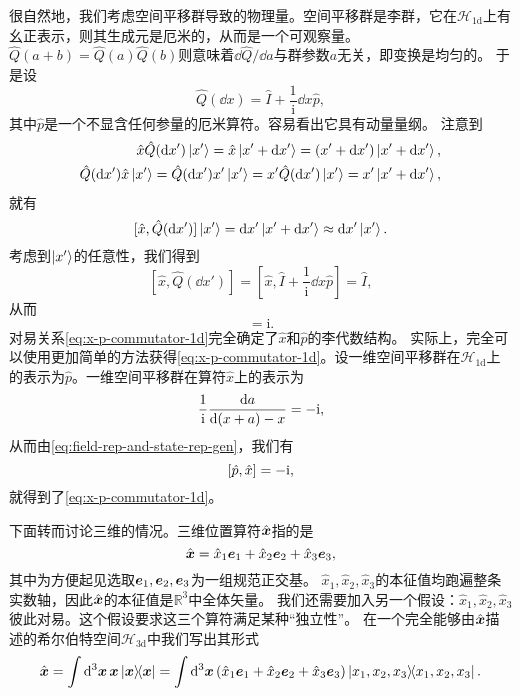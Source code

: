 \documentclass[hyperref, UTF8, a4paper]{ctexart}
\newcommand*{\ii}{\mathrm{i}}
\newcommand*{\reals}{\mathbb{R}}
\begin{document}
很自然地，我们考虑空间平移群导致的物理量。空间平移群是李群，它在$\mathcal{H}_{1\text{d}}$上有幺正表示，则其生成元是厄米的，从而是一个可观察量。
$\hat{Q}(a+b)=\hat{Q}(a) \hat{Q}(b)$则意味着$\dd{\hat{Q}} / \dd{a}$与群参数$a$无关，即变换是均匀的。
于是设
\begin{equation}
    \hat{Q}(\dd{x}) = \hat{I} + \frac{1}{\ii} \dd{x} \hat{p},
\end{equation}
其中$\hat{p}$是一个不显含任何参量的厄米算符。容易看出它具有动量量纲。
注意到
\[
    \begin{split}
        \hat{x} \hat{Q}(\dd{x'}) \ket{x'} = \hat{x} \ket{x' + \dd{x'}} = (x' + \dd{x'}) \ket{x' + \dd{x'}}, \\
        \hat{Q}(\dd{x'}) \hat{x} \ket{x'} = \hat{Q}(\dd{x'}) x' \ket{x'} = x' \hat{Q}(\dd{x'}) \ket{x'} = x' \ket{x' + \dd{x'}},
    \end{split}
\]
就有
\[
    [\hat{x}, \hat{Q}(\dd{x'})] \ket{x'} = \dd{x'} \ket{x' + \dd{x'}} \approx \dd{x'} \ket{x'}.
\]
考虑到$\ket{x'}$的任意性，我们得到
\[
    [\hat{x}, \hat{Q}(\dd{x'})] = \left[\hat{x}, \hat{I} + \frac{1}{\ii} \dd{x} \hat{p}\right] = \hat{I},
\]
从而
\begin{equation}
    [\hat{x}, \hat{p}] = \ii . 
    \label{eq:x-p-commutator-1d}   
\end{equation}
对易关系\eqref{eq:x-p-commutator-1d}完全确定了$\hat{x}$和$\hat{p}$的李代数结构。
实际上，完全可以使用更加简单的方法获得\eqref{eq:x-p-commutator-1d}。设一维空间平移群在$\mathcal{H}_\text{1d}$上的表示为$\hat{p}$。一维空间平移群在算符$\hat{x}$上的表示为
\[
    \frac{1}{\ii} \dv{a} {(x + a) - x} = - \ii,
\]
从而由\eqref{eq:field-rep-and-state-rep-gen}，我们有
\[
    \comm{\hat{p}}{\hat{x}} = - \ii,
\]
就得到了\eqref{eq:x-p-commutator-1d}。

下面转而讨论三维的情况。三维位置算符$\hat{\vb*{x}}$指的是
\begin{equation}
    \hat{\vb*{x}} = \hat{x}_1 \vb*{e}_1 + \hat{x}_2 \vb*{e}_2 + \hat{x}_3 \vb*{e}_3,
\end{equation}
其中为方便起见选取$\vb*{e}_1, \vb*{e}_2, \vb*{e}_3$为一组规范正交基。
$\hat{x}_1, \hat{x}_2, \hat{x}_3$的本征值均跑遍整条实数轴，因此$\hat{\vb*{x}}$的本征值是$\reals^3$中全体矢量。
我们还需要加入另一个假设：$\hat{x}_1, \hat{x}_2, \hat{x}_3$彼此对易。这个假设要求这三个算符满足某种“独立性”。
在一个完全能够由$\hat{\vb*{x}}$描述的希尔伯特空间$\mathcal{H}_{3\text{d}}$中我们写出其形式
\begin{equation}
    \hat{\vb*{x}} = \int \dd[3]{\vb*{x}} \vb*{x} \dyad{\vb*{x}} 
    = \int \dd[3]{\vb*{x}} (\hat{x}_1 \vb*{e}_1 + \hat{x}_2 \vb*{e}_2 + \hat{x}_3 \vb*{e}_3) \dyad{x_1, x_2, x_3}.
\end{equation}
\end{document}
